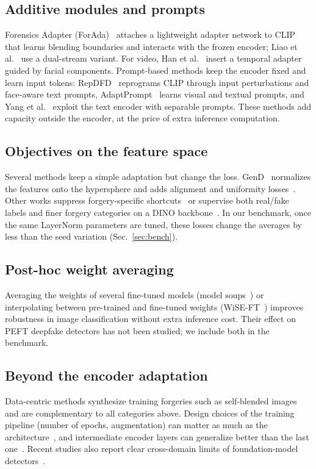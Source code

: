 \documentclass[fonts]{icst}
\begin{document}
\subsection{Additive modules and prompts}
Forensics Adapter (ForAda)~\cite{cui2025forada} attaches a lightweight adapter network to CLIP that learns blending boundaries and interacts with the frozen encoder; Liao et al.~\cite{liao2026dfa} use a dual-stream variant. For video, Han et al.~\cite{han2024fcg} insert a temporal adapter guided by facial components. Prompt-based methods keep the encoder fixed and learn input tokens: RepDFD~\cite{lin2025repdfd} reprograms CLIP through input perturbations and face-aware text prompts, AdaptPrompt~\cite{jiang2026adaptprompt} learns visual and textual prompts, and Yang et al.~\cite{yang2026separable} exploit the text encoder with separable prompts. These methods add capacity outside the encoder, at the price of extra inference computation.

\subsection{Objectives on the feature space}
Several methods keep a simple adaptation but change the loss. GenD~\cite{yermakov2025gend} normalizes the features onto the hypersphere and adds alignment and uniformity losses~\cite{wang2020alignment}. Other works suppress forgery-specific shortcuts~\cite{wang2026shortcut} or supervise both real/fake labels and finer forgery categories on a DINO backbone~\cite{zhang2026dino}. In our benchmark, once the same LayerNorm parameters are tuned, these losses change the averages by less than the seed variation (Sec.~\ref{sec:bench}).

\subsection{Post-hoc weight averaging}
Averaging the weights of several fine-tuned models (model soups~\cite{wortsman2022soups}) or interpolating between pre-trained and fine-tuned weights (WiSE-FT~\cite{wortsman2022wiseft}) improves robustness in image classification without extra inference cost. Their effect on PEFT deepfake detectors has not been studied; we include both in the benchmark.

\subsection{Beyond the encoder adaptation}
Data-centric methods synthesize training forgeries such as self-blended images~\cite{shiohara2022sbi,chen2022sladd,lin2024cdfa} and are complementary to all categories above. Design choices of the training pipeline (number of epochs, augmentation) can matter as much as the architecture~\cite{pellegrini2025design}, and intermediate encoder layers can generalize better than the last one~\cite{park2025mold}. Recent studies also report clear cross-domain limits of foundation-model detectors~\cite{delibasoglu2026limits}.
\end{document}
